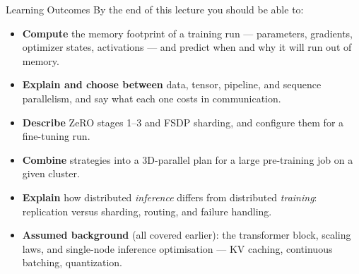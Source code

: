 \begin{frame}{Learning Outcomes}
  By the end of this lecture you should be able to:
  \begin{itemize}\itemsep0.4em
    \item[\textcolor{red}{$\blacktriangleright$}] \textbf{Compute} the memory footprint of a training run --- parameters, gradients, optimizer states, activations --- and predict when and why it will run out of memory.
    \item[\textcolor{red}{$\blacktriangleright$}] \textbf{Explain and choose between} data, tensor, pipeline, and sequence parallelism, and say what each one costs in communication.
    \item[\textcolor{red}{$\blacktriangleright$}] \textbf{Describe} ZeRO stages 1--3 and FSDP sharding, and configure them for a fine-tuning run.
    \item[\textcolor{red}{$\blacktriangleright$}] \textbf{Combine} strategies into a 3D-parallel plan for a large pre-training job on a given cluster.
    \item[\textcolor{red}{$\blacktriangleright$}] \textbf{Explain} how distributed \emph{inference} differs from distributed \emph{training}: replication versus sharding, routing, and failure handling.
  \end{itemize}
  \vspace{0.5em}
  \begin{itemize}\footnotesize
    \item[\textcolor{red}{$\blacktriangleright$}] \textbf{Assumed background} (all covered earlier): the transformer block, scaling laws, and single-node inference optimisation --- KV caching, continuous batching, quantization.
  \end{itemize}
\end{frame}
